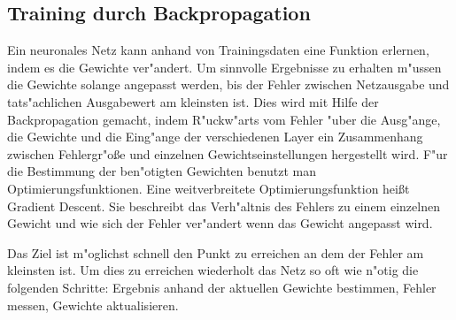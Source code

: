 {\subsection{Training durch Backpropagation}
Ein neuronales Netz kann anhand von Trainingsdaten eine Funktion erlernen, indem es die Gewichte ver"andert. Um sinnvolle Ergebnisse zu erhalten m"ussen die Gewichte solange angepasst werden, bis der Fehler zwischen Netzausgabe und tats"achlichen Ausgabewert am kleinsten ist. Dies wird mit Hilfe der Backpropagation gemacht, indem R"uckw"arts vom Fehler "uber die Ausg"ange, die Gewichte und die Eing"ange der verschiedenen Layer ein Zusammenhang zwischen Fehlergr"o{\ss}e und einzelnen Gewichtseinstellungen hergestellt wird. F"ur die Bestimmung der ben"otigten Gewichten benutzt man Optimierungsfunktionen. Eine weitverbreitete Optimierungsfunktion hei{\ss}t Gradient Descent. Sie beschreibt das Verh"altnis des Fehlers zu einem einzelnen Gewicht und wie sich der Fehler ver"andert wenn das Gewicht angepasst wird.

Das Ziel ist m"oglichst schnell den Punkt zu erreichen an dem der Fehler am kleinsten ist. Um dies zu erreichen wiederholt das Netz so oft wie n"otig die folgenden Schritte: Ergebnis anhand der aktuellen Gewichte bestimmen, Fehler messen, Gewichte aktualisieren.


}
